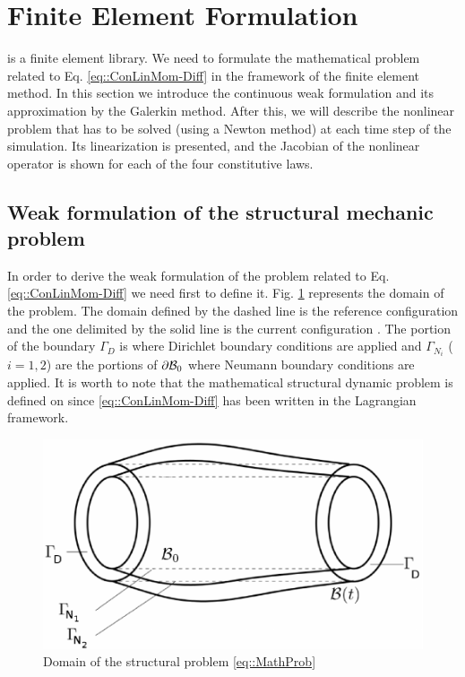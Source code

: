 \section{Finite Element Formulation}
\label{sct-FEF}
\LV is a finite element library. We need to formulate the mathematical problem related to Eq. \eqref{eq::ConLinMom-Diff} in the framework of the finite element method. In this section we introduce the continuous weak formulation and its approximation by the Galerkin method. After this, we will describe the nonlinear problem that has to be solved (using a Newton method) at each time step of the simulation. Its linearization is presented, and the Jacobian of the nonlinear operator is shown for each of the four constitutive laws.

\subsection{Weak formulation of the structural mechanic problem}
\label{sct-ContinuousWF}
In order to derive the weak formulation of the problem related to Eq. \eqref{eq::ConLinMom-Diff} we need first to define it. Fig. \ref{fig::Domain} represents the domain of the problem. The domain defined by the dashed line is the reference configuration \RefCon and the one delimited by the solid line is the current configuration \CurCon. The portion of the boundary $\Gamma _D$ is where Dirichlet boundary conditions are applied and $\Gamma_{N_i}$ ($i=1,2$) are the portions of $\partial \mathcal{B}_0$ where Neumann boundary conditions are applied. It is worth to note that the mathematical structural dynamic problem is defined on \RefCon since \eqref{eq::ConLinMom-Diff} has been written in the Lagrangian framework.

\begin{figure}[h!]
  \centering
  \includegraphics{images/Structure.pdf}
  \caption{Domain of the structural problem \eqref{eq::MathProb}}
  \label{fig::Domain}
\end{figure}

